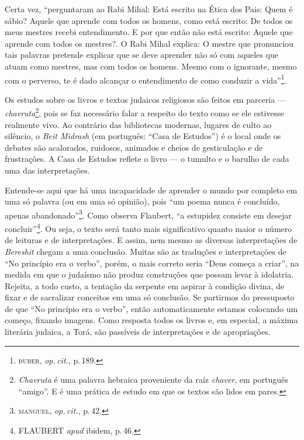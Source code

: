 \begin{center}\end{center}

\noindent{}Certa vez, ``perguntaram ao Rabi Mihal: Está escrito na Ética dos
Pais: Quem é sábio? Aquele que aprende com todos os homens, como está
escrito: De todos os meus mestres recebi entendimento. E por que então
não está escrito: Aquele que aprende com todos os mestres?. O Rabi
Mihal explica: O mestre que pronunciou tais palavras pretende explicar
que se deve aprender não só com aqueles que atuam como mestres, mas com
todos os homens. Mesmo com o ignorante, mesmo com o perverso, te é dado
alcançar o entendimento de como conduzir a vida''\footnote{\textsc{buber},
  \emph{op.\,cit.}, p.\,189.}.

Os estudos sobre os livros e textos judaicos religiosos são feitos em
parceria --- \emph{chavruta}\footnote{\emph{Chavruta} é uma palavra
  hebraica proveniente da raíz \emph{chaver}, em português
  ``amigo''. E é uma prática de estudo em que os textos são lidos em
  pares.}, pois se faz necessário falar a respeito do texto como se ele
estivesse realmente vivo. Ao contrário das bibliotecas modernas, lugares
de culto ao silêncio, o \emph{Beit Midrash} (em português: ``Casa de
Estudos'') é o local onde os debates são acalorados, ruidosos, animados
e cheios de gesticulação e de frustrações. A Casa de Estudos reflete o
livro --- o tumulto e o barulho de cada uma das interpretações.

Entende-se aqui que há uma incapacidade de aprender o mundo por completo
em uma só palavra (ou em uma só opinião), pois ``um poema nunca é
concluído, apenas abandonado''\footnote{\textsc{manguel}, \emph{op.\,cit.}, p.\,42.}.
Como observa Flaubert, ``a estupidez consiste em desejar
concluir''\footnote{FLAUBERT \emph{apud} ibidem, p.\,46.}. Ou seja, o texto
será tanto mais significativo quanto maior o número de leituras e de
interpretações. E assim, nem mesmo as diversas interpretações de
\emph{Bereshit} chegam a uma conclusão. Muitas são as traduções e
interpretações de ``No princípio era o verbo'', porém, o mais
correto seria ``Deus começa a criar'', na medida em que o
judaísmo não produz construções que possam levar à idolatria. Rejeita, a
todo custo, a tentação da serpente em aspirar à condição divina, de
fixar e de sacralizar conceitos em uma só conclusão. Se partirmos do
pressuposto de que ``No princípio era o verbo'', então
automaticamente estamos colocando um começo, fixando imagens. Como
resposta todos os livros e, em especial, a máxima literária judaica, a
Torá, são passíveis de interpretações e de apropriações.


